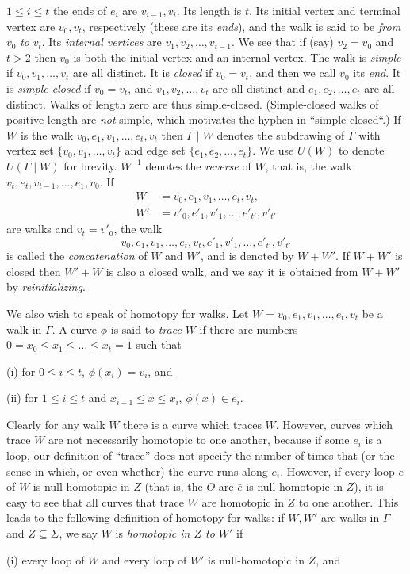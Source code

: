 \noindent $1 \le i \le t$ the ends of $e_i$ are $v_{i-1}, v_i$. Its length is $t$. Its initial vertex and terminal vertex are $v_0, v_t$, respectively (these are its \textit{ends}), and the walk is said to be \textit{from} $v_0$ \textit{to} $v_t$. Its \textit{internal vertices} are $v_1, v_2, \dots, v_{t-1}$. We see that if (say) $v_2 = v_0$ and $t > 2$ then $v_0$ is both the initial vertex and an internal vertex. The walk is \textit{simple} if $v_0, v_1, \dots, v_t$ are all distinct. It is \textit{closed} if $v_0 = v_t$, and then we call $v_0$ its \textit{end}. It is \textit{simple-closed} if $v_0 = v_t$, and $v_1, v_2, \dots, v_t$ are all distinct and $e_1, e_2, \dots, e_t$ are all distinct. Walks of length zero are thus simple-closed. (Simple-closed walks of positive length are \textit{not} simple, which motivates the hyphen in ``simple-closed``.) If $W$ is the walk $v_0, e_1, v_1, \dots, e_t, v_t$ then $\Gamma \mid W$ denotes the subdrawing of $\Gamma$ with vertex set $\{v_0, v_1, \dots, v_t\}$ and edge set $\{e_1, e_2, \dots, e_t\}$. We use $U(W)$ to denote $U(\Gamma \mid W)$ for brevity. $W^{-1}$ denotes the \textit{reverse} of $W$, that is, the walk $v_t, e_t, v_{t-1}, \dots, e_1, v_0$. If
\begin{align*}
W &= v_0, e_1, v_1, \dots, e_t, v_t, \\
W' &= v'_0, e'_1, v'_1, \dots, e'_{t'}, v'_{t'}
\end{align*}
are walks and $v_t = v'_0$, the walk
\begin{equation*}
v_0, e_1, v_1, \dots, e_t, v_t, e'_1, v'_1, \dots, e'_{t'}, v'_{t'}
\end{equation*}
is called the \textit{concatenation} of $W$ and $W'$, and is denoted by $W + W'$. If $W + W'$ is closed then $W' + W$ is also a closed walk, and we say it is obtained from $W + W'$ by \textit{reinitializing}.

We also wish to speak of homotopy for walks. Let $W = v_0, e_1, v_1, \dots, e_t, v_t$ be a walk in $\Gamma$. A curve $\phi$ is said to \textit{trace} $W$ if there are numbers $0 = x_0 \le x_1 \le \dots \le x_t = 1$ such that

\hspace*{12pt}(i) for $0 \le i \le t$, $\phi(x_i) = v_i$, and

\hspace*{12pt}(ii) for $1 \le i \le t$ and $x_{i-1} \le x \le x_i$, $\phi(x) \in \bar{e}_i$.

Clearly for any walk $W$ there is a curve which traces $W$. However, curves which trace $W$ are not necessarily homotopic to one another, because if some $e_i$ is a loop, our definition of ``trace'' does not specify the number of times that (or the sense in which, or even whether) the curve runs along $e_i$. However, if every loop $e$ of $W$ is null-homotopic in $Z$ (that is, the $O$-arc $\bar{e}$ is null-homotopic in $Z$), it is easy to see that all curves that trace $W$ are homotopic in $Z$ to one another. This leads to the following definition of homotopy for walks: if $W, W'$ are walks in $\Gamma$ and $Z \subseteq \Sigma$, we say $W$ is \textit{homotopic in $Z$ to $W'$} if

\hspace*{12pt}(i) every loop of $W$ and every loop of $W'$ is null-homotopic in $Z$, and

